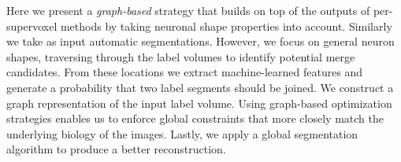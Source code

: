 Here we present a \textit{graph-based} strategy that builds on top of the outputs of per-supervoxel methods by taking neuronal shape properties into account. 
Similarly we take as input automatic segmentations. 
However, we focus on general neuron shapes, traversing through the label volumes to identify potential merge candidates. 
From these locations we extract machine-learned features and generate a probability that two label segments should be joined. 
We construct a graph representation of the input label volume. 
Using graph-based optimization strategies enables us to enforce global constraints that more closely match the underlying biology of the images.
Lastly, we apply a global segmentation algorithm to produce a better reconstruction.




